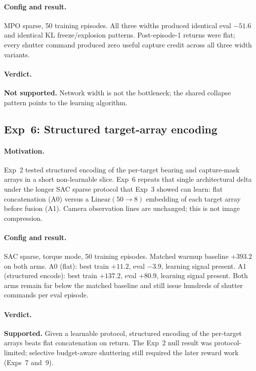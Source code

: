 \paragraph{Config and result.}
MPO sparse, 50 training episodes.
All three widths produced identical eval $-51.6$ and identical KL freeze/explosion patterns.
Post-episode-1 returns were flat; every shutter command produced zero useful capture credit across all three width variants.

\paragraph{Verdict.}
\textbf{Not supported.}
Network width is not the bottleneck; the shared collapse pattern points to the learning algorithm.

\subsection{Exp~6: Structured target-array encoding}
\label{sec:exp6}

\paragraph{Motivation.}
Exp~2 tested structured encoding of the per-target bearing and capture-mask arrays in a short non-learnable slice.
Exp~6 repeats that single architectural delta under the longer SAC sparse protocol that Exp~3 showed can learn:
flat concatenation (A0) versus a $\mathrm{Linear}(50 \to 8)$ embedding of each target array before fusion (A1).
Camera observation lines are unchanged; this is not image compression.

\paragraph{Config and result.}
SAC sparse, torque mode, 50 training episodes.
Matched warmup baseline $+393.2$ on both arms.
A0 (flat): best train $+11.2$, eval $-3.9$, learning signal present.
A1 (structured encode): best train $+137.2$, eval $+80.9$, learning signal present.
Both arms remain far below the matched baseline and still issue hundreds of shutter commands per eval episode.

\paragraph{Verdict.}
\textbf{Supported.}
Given a learnable protocol, structured encoding of the per-target arrays beats flat concatenation on return.
The Exp~2 null result was protocol-limited; selective budget-aware shuttering still required the later reward work (Exps~7 and~9).

